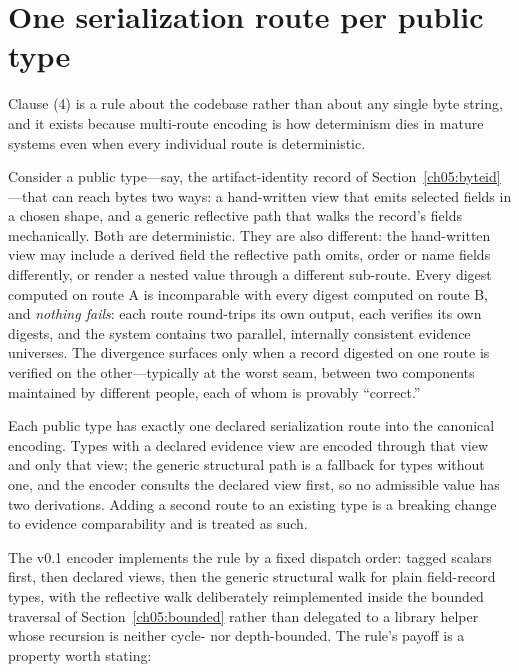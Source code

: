 \section{One serialization route per public type}\label{ch05:oneroute}

Clause (4) is a rule about the codebase rather than about any single byte
string, and it exists because multi-route encoding is how determinism dies
in mature systems even when every individual route is deterministic.

Consider a public type---say, the artifact-identity record of
Section~\ref{ch05:byteid}---that can reach bytes two ways: a hand-written
view that emits selected fields in a chosen shape, and a generic reflective
path that walks the record's fields mechanically. Both are deterministic.
They are also different: the hand-written view may include a derived
field the reflective path omits, order or name fields differently, or
render a nested value through a different sub-route. Every digest computed
on route A is incomparable with every digest computed on route B, and
\emph{nothing fails}: each route round-trips its own output, each verifies
its own digests, and the system contains two parallel, internally
consistent evidence universes. The divergence surfaces only when a record
digested on one route is verified on the other---typically at the worst
seam, between two components maintained by different people, each of whom
is provably ``correct.''

\begin{ruleenv}\label{ch05:rule:oneroute}
Each public type has exactly one declared serialization route into the
canonical encoding. Types with a declared evidence view are encoded through
that view and only that view; the generic structural path is a fallback for
types without one, and the encoder consults the declared view first, so no
admissible value has two derivations. Adding a second route to an existing
type is a breaking change to evidence comparability and is treated as such.
\end{ruleenv}

The v0.1 encoder implements the rule by a fixed dispatch order: tagged
scalars first, then declared views, then the generic structural walk for
plain field-record types, with the reflective walk deliberately reimplemented
inside the bounded traversal of Section~\ref{ch05:bounded} rather than
delegated to a library helper whose recursion is neither cycle- nor
depth-bounded. The rule's payoff is a property worth stating:

